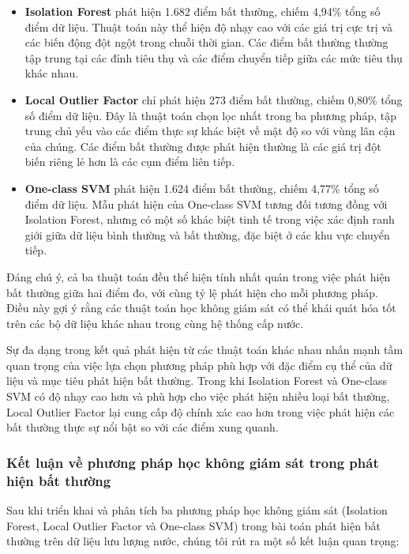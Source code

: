 \begin{itemize}
    \item \textbf{Isolation Forest} phát hiện 1.682 điểm bất thường, chiếm 4,94\% tổng số điểm dữ liệu. Thuật toán này thể hiện độ nhạy cao với các giá trị cực trị và các biến động đột ngột trong chuỗi thời gian. Các điểm bất thường thường tập trung tại các đỉnh tiêu thụ và các điểm chuyển tiếp giữa các mức tiêu thụ khác nhau.
    
    \item \textbf{Local Outlier Factor} chỉ phát hiện 273 điểm bất thường, chiếm 0,80\% tổng số điểm dữ liệu. Đây là thuật toán chọn lọc nhất trong ba phương pháp, tập trung chủ yếu vào các điểm thực sự khác biệt về mật độ so với vùng lân cận của chúng. Các điểm bất thường được phát hiện thường là các giá trị đột biến riêng lẻ hơn là các cụm điểm liên tiếp.
    
    \item \textbf{One-class SVM} phát hiện 1.624 điểm bất thường, chiếm 4,77\% tổng số điểm dữ liệu. Mẫu phát hiện của One-class SVM tương đối tương đồng với Isolation Forest, nhưng có một số khác biệt tinh tế trong việc xác định ranh giới giữa dữ liệu bình thường và bất thường, đặc biệt ở các khu vực chuyển tiếp.
\end{itemize}

Đáng chú ý, cả ba thuật toán đều thể hiện tính nhất quán trong việc phát hiện bất thường giữa hai điểm đo, với cùng tỷ lệ phát hiện cho mỗi phương pháp. Điều này gợi ý rằng các thuật toán học không giám sát có thể khái quát hóa tốt trên các bộ dữ liệu khác nhau trong cùng hệ thống cấp nước.

Sự đa dạng trong kết quả phát hiện từ các thuật toán khác nhau nhấn mạnh tầm quan trọng của việc lựa chọn phương pháp phù hợp với đặc điểm cụ thể của dữ liệu và mục tiêu phát hiện bất thường. Trong khi Isolation Forest và One-class SVM có độ nhạy cao hơn và phù hợp cho việc phát hiện nhiều loại bất thường, Local Outlier Factor lại cung cấp độ chính xác cao hơn trong việc phát hiện các bất thường thực sự nổi bật so với các điểm xung quanh.

\subsubsection{Kết luận về phương pháp học không giám sát trong phát hiện bất thường}

Sau khi triển khai và phân tích ba phương pháp học không giám sát (Isolation Forest, Local Outlier Factor và One-class SVM) trong bài toán phát hiện bất thường trên dữ liệu lưu lượng nước, chúng tôi rút ra một số kết luận quan trọng:

